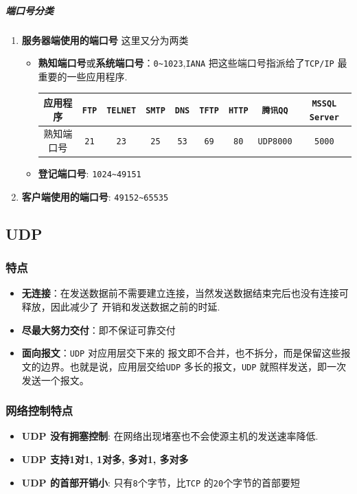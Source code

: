 \documentclass[UTF8,a4paper,8pt]{ctexbook}
\begin{document}
				\subparagraph{端口号分类}
					\begin{enumerate}[fullwidth,itemindent = 2em,label=(\arabic*)]
						\item \textbf{服务器端使用的端口号} 这里又分为两类
							\begin{itemize}[itemindent = 3em]
								\item \textbf{熟知端口号}或\textbf{系统端口号}：\verb|0~1023|,\verb|IANA| 把这些端口号指派给了\verb|TCP/IP| 最重要的一些应用程序.
									\begin{table}[H]
										\centering
										\begin{tabular}{|c|c|c|c|c|c|c|c|c|}
											\hline
											应用程序  & \verb|FTP| & \verb|TELNET| & \verb|SMTP| & \verb|DNS| & \verb|TFTP| & \verb|HTTP| & \verb|腾讯QQ| & \verb|MSSQL Server| \\
											\hline
											熟知端口号   & \verb|21| & \verb|23| & \verb|25| & \verb|53| & \verb|69| & \verb|80| & \verb|UDP8000| & \verb|5000| \\
											\hline
										\end{tabular}
									\end{table}
								\item \textbf{登记端口号}: \verb|1024~49151|
							\end{itemize}
						\item \textbf{客户端使用的端口号}: \verb|49152~65535| 
					\end{enumerate} 
		\subsection{UDP}
			\subsubsection{特点}
				\begin{itemize}
					\item \textbf{无连接}：在发送数据前不需要建立连接，当然发送数据结束完后也没有连接可释放，因此减少了 开销和发送数据之前的时延.
					\item \textbf{尽最大努力交付}：即不保证可靠交付
					\item \textbf{面向报文}：\verb|UDP| 对应用层交下来的 报文即不合并，也不拆分，而是保留这些报文的边界。也就是说，应用层交给\verb|UDP| 多长的报文，\verb|UDP| 就照样发送，即一次发送一个报文。
				\end{itemize}
			\subsubsection{网络控制特点}
				\begin{itemize}
					\item \textbf{UDP 没有拥塞控制}: 在网络出现堵塞也不会使源主机的发送速率降低.
					\item \textbf{UDP 支持1对1, 1对多, 多对1, 多对多}
					\item \textbf{UDP 的首部开销小}: 只有\verb|8|个字节，比\verb|TCP| 的\verb|20|个字节的首部要短
				\end{itemize}
\end{document}
